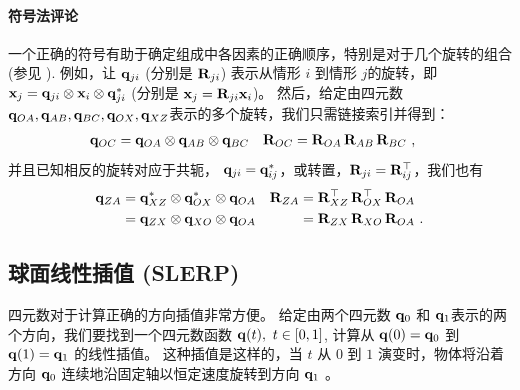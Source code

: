 \paragraph{符号法评论}
一个正确的符号有助于确定组成中各因素的正确顺序，特别是对于几个旋转的组合 (参见 ).
例如，让 ${\bf q}_{ji}$ (分别是 ${\bf R}_{ji}$) 表示从情形 $i$ 到情形 $j$的旋转，即 ${\bf x}_j={\bf q}_{ji}\otimes{\bf x}_i\otimes{\bf q}_{ji}^*$ (分别是 ${\bf x}_j={\bf R}_{ji}{\bf x}_i$)。
然后，给定由四元数 ${\bf q}_{OA},{\bf q}_{AB},{\bf q}_{BC},{\bf q}_{OX},{\bf q}_{XZ}$表示的多个旋转，我们只需链接索引并得到：
%
\begin{align*}
{\bf q}_{OC} &= {\bf q}_{OA}\otimes{\bf q}_{AB}\otimes{\bf q}_{BC}
&
{\bf R}_{OC} &= {\bf R}_{OA}\,{\bf R}_{AB}\,{\bf R}_{BC}
~,
\end{align*}
%
并且已知相反的旋转对应于共轭， ${\bf q}_{ji}={\bf q}_{ij}^*$，或转置，${\bf R}_{ji}={\bf R}_{ij}^{\top}$，我们也有
%
\begin{align*}
{\bf q}_{ZA} &= {\bf q}_{XZ}^*\otimes{\bf q}_{OX}^*\otimes{\bf q}_{OA} 
&
{\bf R}_{ZA} &= {\bf R}_{XZ}^{\top}\,{\bf R}_{OX}^{\top}\,{\bf R}_{OA} 
\\
&= {\bf q}_{ZX}\otimes{\bf q}_{XO}\otimes{\bf q}_{OA}
&
&= {\bf R}_{ZX}\,{\bf R}_{XO}\,{\bf R}_{OA}
~.
\end{align*}




\subsection{球面线性插值 (SLERP)}
\label{sec:slerp}

四元数对于计算正确的方向插值非常方便。 
给定由两个四元数 ${\bf q}_0$ 和 ${\bf q}_1$表示的两个方向，我们要找到一个四元数函数 ${\bf q}(t),~ t\in[0,1]$, 计算从 ${\bf q}(0)={\bf q}_0$ 到 ${\bf q}(1)={\bf q}_1$ 的线性插值。
这种插值是这样的，当 $t$ 从 $0$ 到 $1$ 演变时，物体将沿着方向 ${\bf q}_0$ 连续地沿固定轴以恒定速度旋转到方向 ${\bf q}_1$ 。

